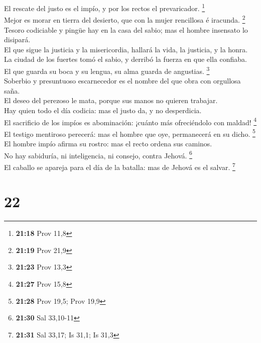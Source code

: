  El rescate del justo es el impío, y por los rectos el
prevaricador. \footnote{\textbf{21:18} Prov 11,8}\\
 Mejor es morar en tierra del desierto, que con la mujer
rencillosa é iracunda. \footnote{\textbf{21:19} Prov 21,9}\\
 Tesoro codiciable y pingüe hay en la casa del sabio; mas
el hombre insensato lo disipará.\\
 El que sigue la justicia y la misericordia, hallará la
vida, la justicia, y la honra.\\
 La ciudad de los fuertes tomó el sabio, y derribó la
fuerza en que ella confiaba.\\
 El que guarda su boca y su lengua, su alma guarda de
angustias. \footnote{\textbf{21:23} Prov 13,3}\\
 Soberbio y presuntuoso escarnecedor es el nombre del que
obra con orgullosa saña.\\
 El deseo del perezoso le mata, porque sus manos no quieren
trabajar.\\
 Hay quien todo el día codicia: mas el justo da, y no
desperdicia.\\
 El sacrificio de los impíos es abominación: ¡cuánto más
ofreciéndolo con maldad! \footnote{\textbf{21:27} Prov 15,8}\\
 El testigo mentiroso perecerá: mas el hombre que oye,
permanecerá en su dicho. \footnote{\textbf{21:28} Prov 19,5; Prov 19,9}\\
 El hombre impío afirma su rostro: mas el recto ordena sus
caminos.\\
 No hay sabiduría, ni inteligencia, ni consejo, contra
Jehová. \footnote{\textbf{21:30} Sal 33,10-11}\\
 El caballo se apareja para el día de la batalla: mas de
Jehová es el salvar. \footnote{\textbf{21:31} Sal 33,17; Is 31,1; Is
  31,3}

\hypertarget{section-21}{%
\section{22}\label{section-21}}

